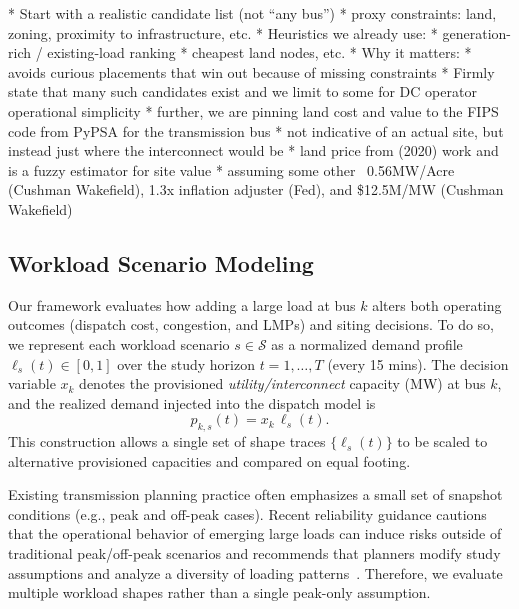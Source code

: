 * Start with a realistic candidate list (not “any bus”)
  * proxy constraints: land, zoning, proximity to infrastructure, etc.
* Heuristics we already use:
  * generation-rich / existing-load ranking
  * cheapest land nodes, etc.
* Why it matters:
  * avoids curious placements that win out because of missing constraints
* Firmly state that many such candidates exist and we limit to some for DC operator operational simplicity
  * further, we are pinning land cost and value to the FIPS code from PyPSA for the transmission bus
  * not indicative of an actual site, but instead just where the interconnect would be
  * land price from (2020) work and is a fuzzy estimator for site value
  * assuming some other ~0.56MW/Acre (Cushman Wakefield), 1.3x inflation adjuster (Fed), and \$12.5M/MW (Cushman Wakefield)

\subsection{Workload Scenario Modeling}\label{sec:workload}
Our framework evaluates how adding a large load at bus $k$ alters both operating outcomes
(dispatch cost, congestion, and LMPs) and siting decisions. To do so, we represent each
workload scenario $s \in \mathcal{S}$ as a normalized demand profile $\ell_s(t)\in[0,1]$ over the study
horizon $t=1,\dots,T$ (every 15 mins). The decision variable $x_k$ denotes the
provisioned \emph{utility/interconnect} capacity (MW) at bus $k$, and the realized demand injected
into the dispatch model is
\begin{equation*}
p_{k,s}(t) = x_k \, \ell_s(t).
\end{equation*}
This construction allows a single set of shape traces $\{\ell_s(t)\}$ to be scaled to alternative
provisioned capacities and compared on equal footing.


Existing transmission planning practice often emphasizes a small set of snapshot conditions
(e.g., peak and off-peak cases). Recent reliability guidance cautions that the operational behavior of
emerging large loads can induce risks outside of traditional peak/off-peak scenarios and recommends
that planners modify study assumptions and analyze a diversity of loading patterns~\cite{nerc2025largeloads, nerc2026}.
Therefore, we evaluate multiple workload shapes rather than a single peak-only
assumption.

